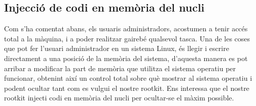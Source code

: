 \subsection{Injecció de codi en memòria del nucli}
Com s'ha comentat abans, els usuaris administradors, acostumen a tenir accés total a la màquina, i a poder realitzar gairebé qualsevol tasca.
Una de les coses que pot fer l'usuari administrador en un sistema Linux, és llegir i escrire directament a una posició de la
memòria del sistema, d'aquesta manera es pot arribar a modificar la part de memòria que utilitza el sistema operatiu per funcionar,
obtenint així un control total sobre què mostrar al sistema operatiu i podent ocultar tant com es vulgui el nostre rootkit.
Ens interessa que el nostre rootkit injecti codi en memòria del nucli per ocultar-se el màxim possible.




